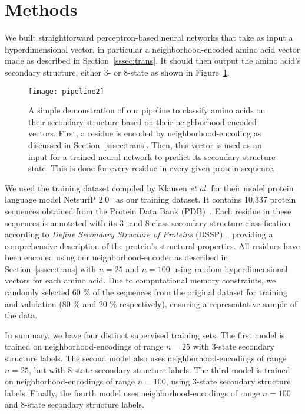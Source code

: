 \section{Methods}
We built straightforward perceptron-based neural networks that take as input a hyperdimensional vector, in particular a neighborhood-encoded amino acid vector made as described in Section~\ref{sssec:trans}. It should then output the amino acid's secondary structure, either 3- or 8-state as shown in Figure~\ref{fig:pipe2}.

\begin{figure}[H]
    \centering
    \texttt{[image: pipeline2]}
    \caption{A simple demonstration of our pipeline to classify amino acids on their secondary structure based on their neighborhood-encoded vectors. First, a residue is encoded by neighborhood-encoding as discussed in Section~\ref{sssec:trans}. Then, this vector is used as an input for a trained neural network to predict its secondary structure state. This is done for every residue in every given protein sequence.}\label{fig:pipe2}
\end{figure}

We used the training dataset compiled by Klausen \textit{et al.} for their model protein language model NetsurfP 2.0~\cite{netsurf} as our training dataset. It contains 10,337 protein sequences obtained from the Protein Data Bank (PDB)~\cite{pdb}. Each residue in these sequences is annotated with its 3- and 8-class secondary structure classification according to \textit{Define Secondary Structure of Proteins} (DSSP)~\cite{dssp}, providing a comprehensive description of the protein's structural properties. All residues have been encoded using our neighborhood-encoder as described in Section~\ref{sssec:trans} with $n=25$ and $n=100$ using random hyperdimensional vectors for each amino acid. Due to computational memory constraints, we randomly selected 60 \% of the sequences from the original dataset for training and validation (80 \% and 20 \% respectively), ensuring a representative sample of the data.

In summary, we have four distinct supervised training sets. The first model is trained on neighborhood-encodings of range $n=25$ with 3-state secondary structure labels. The second model also uses neighborhood-encodings of range $n=25$, but with 8-state secondary structure labels. The third model is trained on neighborhood-encodings of range $n=100$, using 3-state secondary structure labels. Finally, the fourth model uses neighborhood-encodings of range $n=100$ and 8-state secondary structure labels.

